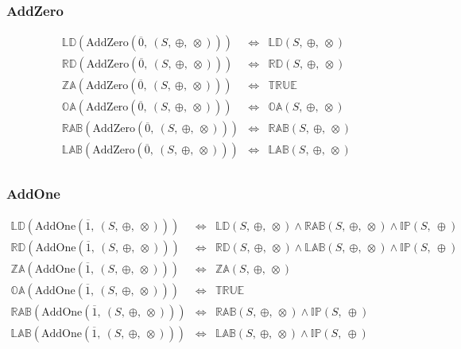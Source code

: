 \documentclass[10pt]{article}
\newcommand{\propname}[1]{{\mathbb{#1}}}
\begin{document}
\subsubsection{AddZero} 

\[
\begin{array}{rcl} 
\propname{LD}(\mathrm{AddZero}(\overline{0},\ (S,\ \oplus,\ \otimes))) 
    & \Leftrightarrow %
    & \propname{LD}(S,\ \oplus,\ \otimes) \\
\propname{RD}(\mathrm{AddZero}(\overline{0},\ (S,\ \oplus,\ \otimes))) 
    & \Leftrightarrow %
    & \propname{RD}(S,\ \oplus,\ \otimes) \\
\propname{ZA}(\mathrm{AddZero}(\overline{0},\ (S,\ \oplus,\ \otimes))) 
    & \Leftrightarrow %
    & \propname{TRUE}\\ 
\propname{OA}(\mathrm{AddZero}(\overline{0},\ (S,\ \oplus,\ \otimes))) 
    & \Leftrightarrow %
    & \propname{OA}(S,\ \oplus,\ \otimes) \\
\propname{RAB}(\mathrm{AddZero}(\overline{0},\ (S,\ \oplus,\ \otimes))) 
    & \Leftrightarrow %
    & \propname{RAB}(S,\ \oplus,\ \otimes)\\ 
\propname{LAB}(\mathrm{AddZero}(\overline{0},\ (S,\ \oplus,\ \otimes))) 
    & \Leftrightarrow %
    & \propname{LAB}(S,\ \oplus,\ \otimes)\\ 
\end{array} 
\] 

\subsubsection{AddOne} 


\[
\begin{array}{rcl} 
\propname{LD}(\mathrm{AddOne}(\overline{1},\ (S,\ \oplus,\ \otimes))) 
    & \Leftrightarrow %
    & \propname{LD}(S,\ \oplus,\ \otimes) 
      \wedge \propname{RAB}(S,\ \oplus,\ \otimes) 
      \wedge  \propname{IP}(S,\ \oplus) 
    \\
\propname{RD}(\mathrm{AddOne}(\overline{1},\ (S,\ \oplus,\ \otimes))) 
    & \Leftrightarrow %
    & \propname{RD}(S,\ \oplus,\ \otimes) 
      \wedge\propname{LAB}(S,\ \oplus,\ \otimes) 
      \wedge\propname{IP}(S,\ \oplus) 
    \\
\propname{ZA}(\mathrm{AddOne}(\overline{1},\ (S,\ \oplus,\ \otimes))) 
    & \Leftrightarrow %
    & \propname{ZA}(S,\ \oplus,\ \otimes) \\
\propname{OA}(\mathrm{AddOne}(\overline{1},\ (S,\ \oplus,\ \otimes))) 
    & \Leftrightarrow %
    & \propname{TRUE}\\ 
\propname{RAB}(\mathrm{AddOne}(\overline{1},\ (S,\ \oplus,\ \otimes))) 
    & \Leftrightarrow %
    & \propname{RAB}(S,\ \oplus,\ \otimes) 
      \wedge \propname{IP}(S,\ \oplus) \\ 
\propname{LAB}(\mathrm{AddOne}(\overline{1},\ (S,\ \oplus,\ \otimes))) 
    & \Leftrightarrow %
    & \propname{LAB}(S,\ \oplus,\ \otimes)
      \wedge \propname{IP}(S,\ \oplus) 
\\ 
\end{array} 
\] 
\end{document}
